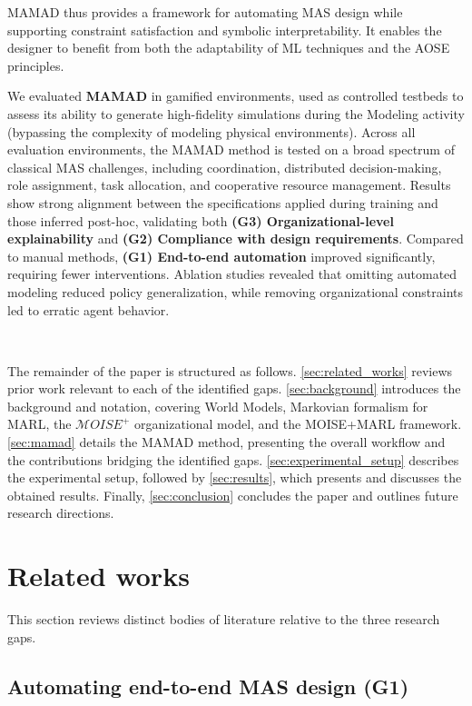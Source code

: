 \documentclass[pdflatex,sn-mathphys-num]{sn-jnl}%
\theoremstyle{thmstyleone}%
\theoremstyle{thmstyletwo}%
\theoremstyle{thmstylethree}%
\begin{document}
\noindent MAMAD thus provides a framework for automating MAS design while supporting constraint satisfaction and symbolic interpretability. It enables the designer to benefit from both the adaptability of ML techniques and the AOSE principles.

We evaluated \textbf{MAMAD} in gamified environments, used as controlled testbeds to assess its ability to generate high-fidelity simulations during the Modeling activity (bypassing the complexity of modeling physical environments). Across all evaluation environments, the MAMAD method is tested on a broad spectrum of classical MAS challenges, including coordination, distributed decision-making, role assignment, task allocation, and cooperative resource management. Results show strong alignment between the specifications applied during training and those inferred post-hoc, validating both \textbf{(G3) Organizational-level explainability} and \textbf{(G2) Compliance with design requirements}. Compared to manual methods, \textbf{(G1) End-to-end automation} improved significantly, requiring fewer interventions. Ablation studies revealed that omitting automated modeling reduced policy generalization, while removing organizational constraints led to erratic agent behavior.

\

\noindent The remainder of the paper is structured as follows. \autoref{sec:related_works} reviews prior work relevant to each of the identified gaps. \autoref{sec:background} introduces the background and notation, covering World Models, Markovian formalism for MARL, the $\mathcal{M}OISE^+$ organizational model, and the MOISE+MARL framework. \autoref{sec:mamad} details the MAMAD method, presenting the overall workflow and the contributions bridging the identified gaps. \autoref{sec:experimental_setup} describes the experimental setup, followed by \autoref{sec:results}, which presents and discusses the obtained results. Finally, \autoref{sec:conclusion} concludes the paper and outlines future research directions.

\section{Related works}\label{sec:related_works}

This section reviews distinct bodies of literature relative to the three research gaps.

\subsection{Automating end-to-end MAS design (G1)}
\end{document}
